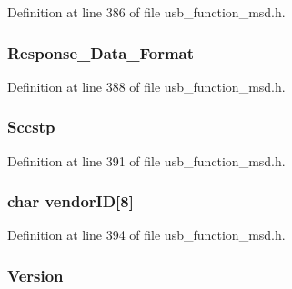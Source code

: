 Definition at line 386 of file usb\+\_\+function\+\_\+msd.\+h.

\hypertarget{struct_inquiry_response_a7b3511a819c3aa219bdcaaa78143be35}{}
\subsubsection[{Response\+\_\+\+Data\+\_\+\+Format}]{ Response\+\_\+\+Data\+\_\+\+Format}\label{struct_inquiry_response_a7b3511a819c3aa219bdcaaa78143be35}


Definition at line 388 of file usb\+\_\+function\+\_\+msd.\+h.

\hypertarget{struct_inquiry_response_a4be7f553d9e29ea87bee7c86707b129a}{}
\subsubsection[{Sccstp}]{ Sccstp}\label{struct_inquiry_response_a4be7f553d9e29ea87bee7c86707b129a}


Definition at line 391 of file usb\+\_\+function\+\_\+msd.\+h.

\hypertarget{struct_inquiry_response_a6e7ff767984c6c3c6f11c0847741cc34}{}
\subsubsection[{vendor\+I\+D}]{\setlength{\rightskip}{0pt plus 5cm}char vendor\+I\+D\mbox{[}8\mbox{]}}\label{struct_inquiry_response_a6e7ff767984c6c3c6f11c0847741cc34}


Definition at line 394 of file usb\+\_\+function\+\_\+msd.\+h.

\hypertarget{struct_inquiry_response_a577c23a9e78dc407891d2b2bbc13c227}{}
\subsubsection[{Version}]{ Version}\label{struct_inquiry_response_a577c23a9e78dc407891d2b2bbc13c227}


